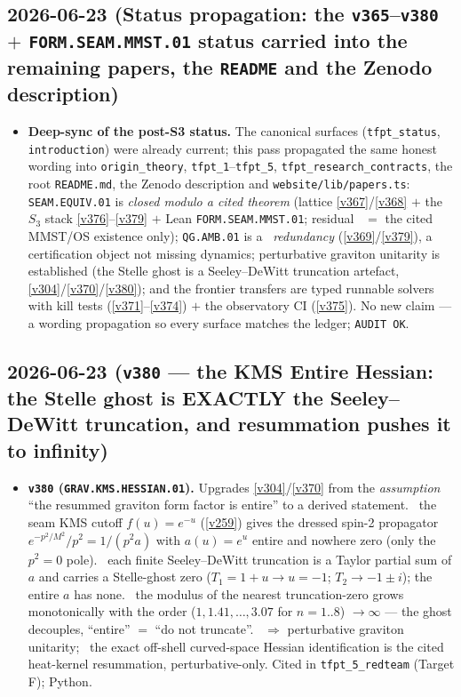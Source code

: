 \subsection*{2026-06-23 (Status propagation: the \texttt{v365}--\texttt{v380} $+$ \texttt{FORM.SEAM.MMST.01} status carried into the remaining papers, the \texttt{README} and the Zenodo description)}
\begin{itemize}
\item \textbf{Deep-sync of the post-S3 status.} The canonical surfaces (\texttt{tfpt\_status}, \texttt{introduction})
were already current; this pass propagated the same honest wording into \texttt{origin\_theory},
\texttt{tfpt\_1}--\texttt{tfpt\_5}, \texttt{tfpt\_research\_contracts}, the root \texttt{README.md}, the Zenodo
description and \texttt{website/lib/papers.ts}: \texttt{SEAM.EQUIV.01} is \emph{closed modulo a cited theorem}
(lattice \vref{v367}/\vref{v368} $+$ the $S_3$ stack \vref{v376}--\vref{v379} $+$ Lean \texttt{FORM.SEAM.MMST.01};
residual \mO\ $=$ the cited MMST/OS existence only); \texttt{QG.AMB.01} is a \mC\ \emph{redundancy} (\vref{v369}/\vref{v379}),
a certification object not missing dynamics; perturbative graviton unitarity is established (the Stelle ghost is a
Seeley--DeWitt truncation artefact, \vref{v304}/\vref{v370}/\vref{v380}); and the frontier transfers are typed runnable
solvers with kill tests (\vref{v371}--\vref{v374}) $+$ the observatory CI (\vref{v375}). No new claim --- a wording
propagation so every surface matches the ledger; \texttt{AUDIT OK}.
\end{itemize}

\subsection*{2026-06-23 (\texttt{v380} --- the KMS Entire Hessian: the Stelle ghost is EXACTLY the Seeley--DeWitt truncation, and resummation pushes it to infinity)}
\begin{itemize}
\item \textbf{\texttt{v380} (\texttt{GRAV.KMS.HESSIAN.01}).} Upgrades \vref{v304}/\vref{v370} from the
\emph{assumption} ``the resummed graviton form factor is entire'' to a derived statement. \mE\ the seam KMS
cutoff $f(u){=}e^{-u}$ (\vref{v259}) gives the dressed spin-2 propagator $e^{-p^2/M^2}/p^2 = 1/(p^2 a)$ with
$a(u){=}e^u$ entire and nowhere zero (only the $p^2{=}0$ pole). \mE\ each finite Seeley--DeWitt truncation is a
Taylor partial sum of $a$ and carries a Stelle-ghost zero ($T_1{=}1{+}u\to u{=}-1$; $T_2\to-1{\pm}i$); the
entire $a$ has none. \mE\ the modulus of the nearest truncation-zero grows monotonically with the order
($1,1.41,\dots,3.07$ for $n{=}1..8$) $\to\infty$ --- the ghost decouples, ``entire'' $=$ ``do not truncate''.
\mC\ $\Rightarrow$ perturbative graviton unitarity; \mO\ the exact off-shell curved-space Hessian
identification is the cited heat-kernel resummation, perturbative-only. Cited in \texttt{tfpt\_5\_redteam}
(Target F); Python.
\end{itemize}

